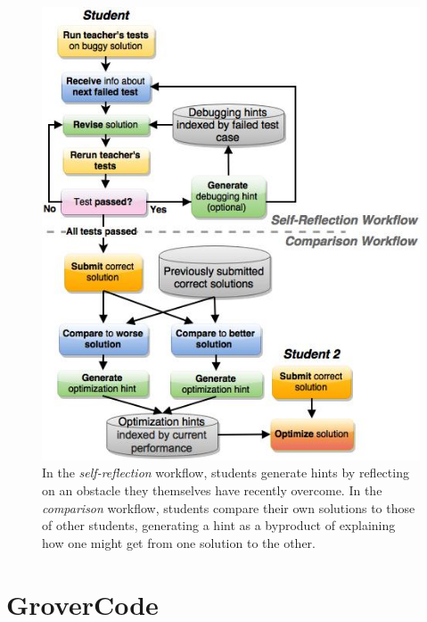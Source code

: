 \begin{figure}
\centering
\includegraphics[width=1.0\linewidth]{Body/figures/classoverflow/CombinedWorkflow_CameraReady_FIXED_2.jpg}
\caption{In the \textit{self-reflection} workflow, students generate hints by reflecting on an obstacle they themselves have recently overcome. In the \textit{comparison} workflow, students compare their own solutions to those of other students, generating a hint as a byproduct of explaining how one might get from one solution to the other.}
\label{fig:workflow}
\end{figure}


\section{GroverCode}

